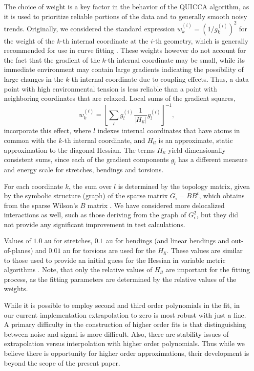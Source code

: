 \documentclass[prl,twocolumn,showpacs,twocolumngrid,superbib]{revtex4}
\begin{document}
The choice of weight is a key factor in the behavior of the QUICCA algorithm, as it is used to prioritize 
reliable portions of the data and to generally smooth noisy trends.  
Originally, we considered the standard expression $w_{k}^{(i)}=\left(1/{g_{k}^{(i)}}\right)^2$ for the weight 
of the $k$-th internal coordinate at the $i$-th geometry, which is generally recommended for use in curve 
fitting \cite{numerical_recipies}.  These weights however do not 
account for the fact that the gradient of the $k$-th internal coordinate may be small, while 
its immediate  environment may contain large gradients indicating the possibility of large changes in the $k$-th 
internal coordinate due to coupling effects.  Thus, a data point with high environmental tension 
is less reliable than a point with neighboring coordinates that are relaxed.   
Local sums of the gradient squares,
\begin{equation}
\label{weights}
w_{k}^{(i)} = \left[ \sum_{l} g_{l}^{(i)} \frac{1}{|H_{ll}^{}|} g_{l}^{(i)} \right]^{-1} ,
\end{equation}
incorporate this effect, where  $l$ indexes internal coordinates that have atoms in common with 
the $k$-th internal coordinate, and $H_{ll}^{}$ is an approximate, static approximation to the 
diagonal Hessian.  The terms $H_{ll}$ yield dimensionally consistent sums, since each of the gradient 
components  $g_{l}$ has a different measure and energy scale for stretches, bendings and torsions.  

For each coordinate $k$, the sum over $l$ is determined by the topology matrix, given by the symbolic 
structure (graph) of the sparse matrix $G_{i}=BB^{t}$, which obtains from the sparse Wilson's $B$ 
matrix \cite{wilson}.  We have considered more delocalized interactions as well, such as those deriving 
from the graph of $G_i^2$, but they did not provide any significant improvement in test calculations.

Values of $1.0$ au for stretches, $0.1$ au for bendings (and linear bendings and out-of-planes) and $0.01$ au
for torsions are used for the $H_{ll}$.  These values are similar to those used to provide 
an initial guess for the Hessian in variable metric algorithms \cite{bakken}.  Note, that only the relative 
values of $H_{ll}$ are important for the fitting process, as the fitting parameters are determined by the 
relative values of the weights.  

While it is possible to employ second and third order polynomials in the fit, in our 
current implementation extrapolation to zero is most robust with just a line.  
A primary difficulty in the construction of higher order fits is that distinguishing 
between noise and signal is more difficult.  Also, there are stability 
issues of extrapolation versus interpolation with higher order polynomials.
Thus while we believe there is opportunity for higher order approximations,  
their development is beyond the scope of the present paper.  
\end{document}
